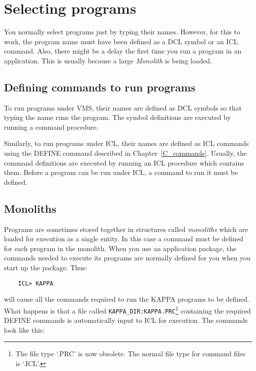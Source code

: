 \section{Selecting programs}
\label{S_selprog}

You normally select programs just by typing their names.
However, for this to work, the program name must have been defined as a DCL
symbol or an ICL command.
Also, there might be a delay the first time you run a program in an application.
This is usually because a large {\em Monolith} is being loaded.

\subsection{Defining commands to run programs}

To run programs under VMS, their names are defined as DCL symbols so that typing
the name runs the program.
The symbol definitions are executed by running a command procedure.

Similarly, to run programs under ICL, their names are defined as ICL commands
using the DEFINE command described in Chapter~\ref{C_commands}.
Usually, the command definitions are executed by running an ICL procedure which
contains them.
Before a program can be run under ICL, a command to run it must be defined.

\subsection{Monoliths}

Programs are sometimes stored together in structures called {\em monoliths}
which are loaded for execution as a single entity.
In this case a command must be defined for each program in the monolith.
When you use an application package, the commands needed to execute its programs
are normally defined for you when you start up the package.
Thus:

\begin{small}
\begin{verbatim}
    ICL> KAPPA
\end{verbatim}
\end{small}

will cause all the commands required to run the KAPPA programs to be defined.
What happens is that a file called {\small\tt KAPPA\_DIR:KAPPA.PRC}\footnote{
The file type `.PRC' is now obsolete.  The normal file type for command files
is `.ICL'.} containing the required DEFINE commands is automatically input to
ICL for execution.
The commands look like this:

